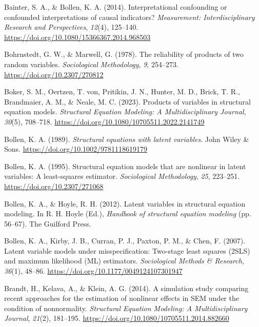 \documentclass[
  man,
  longtable,
  nolmodern,
  notxfonts,
  notimes,
  colorlinks=true,linkcolor=blue,citecolor=blue,urlcolor=blue]{apa7}
\newlength{\cslhangindent}
\newenvironment{CSLReferences}[2] %
 {\begin{list}{}{%
  \setlength{\itemindent}{0pt}
  \setlength{\leftmargin}{0pt}
  \setlength{\parsep}{0pt}
  \ifodd #1
   \setlength{\leftmargin}{\cslhangindent}
   \setlength{\itemindent}{-1\cslhangindent}
  \fi
  \setlength{\itemsep}{#2\baselineskip}}}
 {\end{list}}
\begin{document}
\protect{}\label{refs}
\begin{CSLReferences}{1}{0}
Bainter, S. A., \& Bollen, K. A. (2014). Interpretational confounding or
confounded interpretations of causal indicators? \emph{Measurement:
Interdisciplinary Research and Perspectives}, \emph{12}(4), 125--140.
\url{https://doi.org/10.1080/15366367.2014.968503}

Bohrnstedt, G. W., \& Marwell, G. (1978). The reliability of products of
two random variables. \emph{Sociological Methodology}, \emph{9},
254--273. \url{https://doi.org/10.2307/270812}

Boker, S. M., Oertzen, T. von, Pritikin, J. N., Hunter, M. D., Brick, T.
R., Brandmaier, A. M., \& Neale, M. C. (2023). Products of variables in
structural equation models. \emph{Structural Equation Modeling: A
Multidisciplinary Journal}, \emph{30}(5), 708--718.
\url{https://doi.org/10.1080/10705511.2022.2141749}

Bollen, K. A. (1989). \emph{Structural equations with latent variables}.
John Wiley \& Sons. \url{https://doi.org/10.1002/9781118619179}

Bollen, K. A. (1995). Structural equation models that are nonlinear in
latent variables: A least-squares estimator. \emph{Sociological
Methodology}, \emph{25}, 223--251. \url{https://doi.org/10.2307/271068}

Bollen, K. A., \& Hoyle, R. H. (2012). Latent variables in structural
equation modeling. In R. H. Hoyle (Ed.), \emph{Handbook of structural
equation modeling} (pp. 56--67). The Guilford Press.

Bollen, K. A., Kirby, J. B., Curran, P. J., Paxton, P. M., \& Chen, F.
(2007). Latent variable models under misspecification: Two-stage least
squares ({2SLS}) and maximum likelihood ({ML}) estimators.
\emph{Sociological Methods \& Research}, \emph{36}(1), 48--86.
\url{https://doi.org/10.1177/0049124107301947}

Brandt, H., Kelava, A., \& Klein, A. G. (2014). A simulation study
comparing recent approaches for the estimation of nonlinear effects in
{SEM} under the condition of nonnormality. \emph{Structural Equation
Modeling: A Multidisciplinary Journal}, \emph{21}(2), 181--195.
\url{https://doi.org/10.1080/10705511.2014.882660}


\end{CSLReferences}
\end{document}
